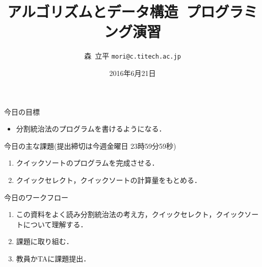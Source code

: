 \documentclass[a4paper,twoside,onecolumn,openany,article]{memoir}
\title{アルゴリズムとデータ構造~プログラミング演習}
\date{2016年6月21日}
\author{森~立平 \texttt{mori@c.titech.ac.jp}}
\theoremstyle{remark}
\begin{document}
\maketitle

\noindent
今日の目標
\begin{itemize}
\item 分割統治法のプログラムを書けるようになる．
\end{itemize}

\noindent
今日の主な課題(提出締切は今週金曜日 23時59分59秒)
\begin{enumerate}
\item クイックソートのプログラムを完成させる．
\item クイックセレクト，クイックソートの計算量をもとめる．
\end{enumerate}

\noindent
今日のワークフロー
\begin{enumerate}
\item この資料をよく読み分割統治法の考え方，クイックセレクト，クイックソートについて理解する．
\item 課題に取り組む．
\item 教員かTAに課題提出．
\end{enumerate}

\end{document}
